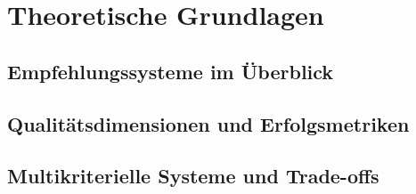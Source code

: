 \section{Theoretische Grundlagen}

\subsection{Empfehlungssysteme im Überblick}

\subsection{Qualitätsdimensionen und Erfolgsmetriken}

\subsection{Multikriterielle Systeme und Trade-offs}

